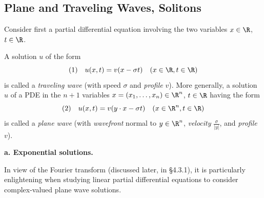 \subsection{Plane and Traveling Waves, Solitons}
\label{sec:plane-traveling-waves-solitons}

Consider first a partial differential equation involving the two variables $x \in \R$, $t \in \R$.

\begin{definition}
\label{def:traveling-wave-plane-wave}
A solution $u$ of the form
$$(1) \quad u(x,t) = v(x - \sigma t) \quad (x \in \R, t \in \R)$$
is called a \textit{traveling wave} (with speed $\sigma$ and \textit{profile} $v$). More generally, a solution $u$ of a PDE in the $n + 1$ variables $x = (x_1,\ldots,x_n) \in \R^n$, $t \in \R$ having the form
$$(2) \quad u(x,t) = v(y \cdot x - \sigma t) \quad (x \in \R^n, t \in \R)$$
is called a \textit{plane wave} (with \textit{wavefront} normal to $y \in \R^n$, \textit{velocity} $\frac{\sigma}{|y|}$, and \textit{profile} $v$).
\end{definition}

\textbf{a. Exponential solutions.}

In view of the Fourier transform (discussed later, in \S4.3.1), it is particularly enlightening when studying linear partial differential equations to consider complex-valued plane wave solutions.

